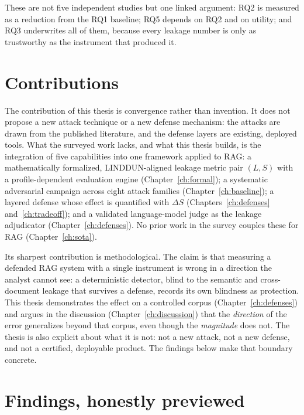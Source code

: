 \documentclass[11pt,a4paper]{report}
\begin{document}
These are not five independent studies but one linked argument: RQ2 is measured as a reduction
from the RQ1 baseline; RQ5 depends on RQ2 and on utility; and RQ3 underwrites all of them,
because every leakage number is only as trustworthy as the instrument that produced it.

\section{Contributions}
\label{sec:intro-contrib}

The contribution of this thesis is convergence rather than invention. It does not propose a new
attack technique or a new defense mechanism: the attacks are drawn from the published literature,
and the defense layers are existing, deployed tools. What the surveyed work lacks, and what this
thesis builds, is the integration of five capabilities into one framework applied to RAG: a
mathematically formalized, LINDDUN-aligned leakage metric pair $(L,S)$ with a profile-dependent
evaluation engine (Chapter~\ref{ch:formal}); a systematic adversarial campaign across eight attack
families (Chapter~\ref{ch:baseline}); a layered defense whose effect is quantified with $\Delta S$
(Chapters~\ref{ch:defenses} and~\ref{ch:tradeoff}); and a validated language-model judge as the
leakage adjudicator (Chapter~\ref{ch:defenses}). No prior work in the survey couples these for RAG
(Chapter~\ref{ch:sota}).

Its sharpest contribution is methodological. The claim is that measuring a defended RAG system with
a single instrument is wrong in a direction the analyst cannot see: a deterministic detector, blind
to the semantic and cross-document leakage that survives a defense, records its own blindness as
protection. This thesis demonstrates the effect on a controlled corpus (Chapter~\ref{ch:defenses})
and argues in the discussion (Chapter~\ref{ch:discussion}) that the \emph{direction} of the error
generalizes beyond that corpus, even though the \emph{magnitude} does not. The thesis is also
explicit about what it is not: not a new attack, not a new defense, and not a certified, deployable
product. The findings below make that boundary concrete.

\section{Findings, honestly previewed}
\label{sec:intro-findings}
\end{document}
